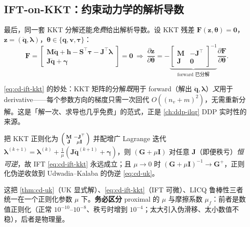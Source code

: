 \subsection{IFT-on-KKT：约束动力学的解析导数}
最后，同一套 KKT 分解还能\emph{免费}给出解析导数。设 KKT 残差 $\mathbf F(\mathbf z,\boldsymbol\theta)=\mathbf 0$，$\mathbf z=(\ddot{\mathbf q},\boldsymbol\lambda)$，$\boldsymbol\theta\in\{\mathbf q,\mathbf v,\boldsymbol\tau\}$：
\begin{equation}
  \mathbf F=\begin{bmatrix}\mathbf M\ddot{\mathbf q}+\mathbf h-\mathbf S^\top\boldsymbol\tau-\mathbf J^\top\boldsymbol\lambda\\ \mathbf J\ddot{\mathbf q}+\boldsymbol\gamma\end{bmatrix}=\mathbf 0\ \Longrightarrow\ \frac{\partial\mathbf z}{\partial\boldsymbol\theta}=-\underbrace{\begin{bmatrix}\mathbf M&-\mathbf J^\top\\\mathbf J&\mathbf 0\end{bmatrix}^{-1}}_{\text{forward 已分解}}\frac{\partial\mathbf F}{\partial\boldsymbol\theta}.
  \label{eq:cd-ift-kkt}
\end{equation}

\begin{insight}
\cref{eq:cd-ift-kkt} 的妙处：KKT 矩阵的分解\emph{既}用于 forward（解出 $\ddot{\mathbf q},\boldsymbol\lambda$）\emph{又}用于 derivative——每个参数方向的梯度只需一次回代 $O((n_v+m)^2)$，无需重新分解。这是「解一次、求导也几乎免费」的范式，正是 \cref{ch:ddp-ilqr} DDP 实时性的来源。
\end{insight}

\begin{theorem}\label{thm:cd-proximal}
把 KKT 正则化为 $\begin{psmallmatrix}\mathbf M&-\mathbf J^\top\\\mathbf J&\mu\mathbf I\end{psmallmatrix}$ 并配增广 Lagrange 迭代 $\boldsymbol\lambda^{(k+1)}=\boldsymbol\lambda^{(k)}+\tfrac1\mu(\mathbf J\ddot{\mathbf q}^{(k+1)}+\boldsymbol\gamma)$，则 $(\mathbf G+\mu\mathbf I)$ 对任意 $\mathbf J$（即便秩亏）\emph{恒可逆}，故 IFT \cref{eq:cd-ift-kkt} 永远成立；且 $\mu\to0$ 时 $(\mathbf G+\mu\mathbf I)^{-1}\to\mathbf G^+$，正则化伪逆收敛到 Udwadia--Kalaba 的伪逆 \cref{eq:cd-uk}。
\end{theorem}
\noindent 这把 \cref{thm:cd-uk}（UK 显式解）、\cref{eq:cd-ift-kkt}（IFT 可微）、LICQ 鲁棒性三者统一在一个正则化参数 $\mu$ 下。\textbf{务必区分} proximal 的 $\mu$ 与摩擦系数 $\mu_f$：前者是数值正则化（正常 $10^{-10}$–$10^{-8}$、秩亏时增到 $10^{-4}$；太大引入伪滑移、太小数值不稳），后者是物理量。

